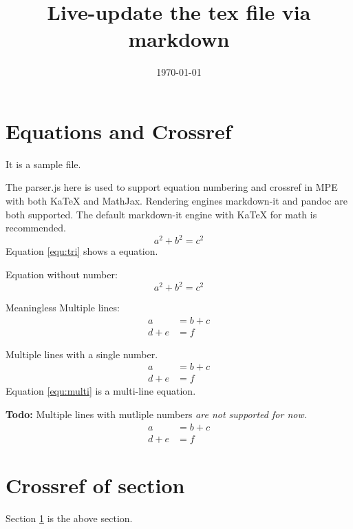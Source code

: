 \documentclass[12pt]{article}
\begin{document}
\title{Live-update the tex file via markdown}
\author{}
\date{\today}

\maketitle

\section{Equations and Crossref}\label{sec:cross}

It is a sample file.

The parser.js here is used to support equation numbering and crossref in MPE with both KaTeX and MathJax. Rendering engines markdown-it and pandoc are both supported. The default markdown-it engine with KaTeX for math is recommended.
\begin{equation}\label{equ:tri}
    a^2 + b^2 = c^2
\end{equation}
Equation \ref{equ:tri} shows a equation.


Equation without number:
\begin{equation*}
    a^2 + b^2 = c^2
\end{equation*}

Meaningless Multiple lines:
\begin{align*}
    a&=b+c \\
    d+e&=f
\end{align*}


Multiple lines with a single number.
\begin{equation}\label{equ:multi}
    \begin{aligned}
        a&=b+c \\
        d+e&=f
    \end{aligned}
\end{equation}
Equation \ref{equ:multi} is a multi-line equation.

\textbf{Todo:} Multiple lines with mutliple numbers \textit{are not supported for now.}
\begin{align}
    a&=b+c \\
    d+e&=f
\end{align}

\section{Crossref of section}

Section \ref{sec:cross} is the above section.

% 
% 

\end{document}
